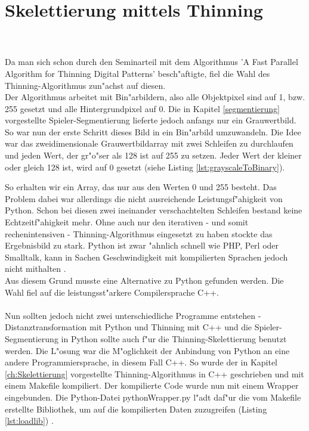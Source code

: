 \section{Skelettierung mittels Thinning} 
\label{implThinning}
 \\ \\
Da man sich schon durch den Seminarteil mit dem Algorithmus 'A Fast Parallel Algorithm for Thinning Digital Patterns' besch"aftigte, fiel die Wahl des Thinning-Algorithmus zun"achst auf diesen. \\
Der Algorithmus arbeitet mit Bin"arbildern, also alle Objektpixel sind auf 1, bzw. 255 gesetzt und alle Hintergrundpixel auf 0. Die in Kapitel \ref{segmentierung} vorgestellte Spieler-Segmentierung lieferte jedoch anfangs nur ein Grauwertbild. So war nun der erste Schritt dieses Bild in ein Bin"arbild umzuwandeln. Die Idee war das zweidimensionale Grauwertbildarray mit zwei Schleifen zu durchlaufen und jeden Wert, der gr"o"ser als 128 ist auf 255 zu setzen. Jeder Wert der kleiner oder gleich 128 ist, wird auf 0 gesetzt (siehe Listing \ref{lst:grayscaleToBinary}). 

So erhalten wir ein Array, das nur aus den Werten 0 und 255 besteht. Das Problem dabei war allerdings die nicht ausreichende Leistungsf"ahigkeit von Python. Schon bei diesen zwei ineinander verschachtelten Schleifen bestand keine Echtzeitf"ahigkeit mehr. Ohne auch nur den iterativen - und somit rechenintensiven - Thinning-Algorithmus eingesetzt zu haben stockte das Ergebnisbild zu stark. Python ist zwar "ahnlich schnell wie PHP, Perl oder Smalltalk, kann in Sachen Geschwindigkeit mit kompilierten Sprachen jedoch nicht mithalten \cite{python}. \\Aus diesem Grund musste eine Alternative zu Python gefunden werden. Die Wahl fiel auf die leistungsst"arkere Compilersprache C++. \\ \\
Nun sollten jedoch nicht zwei unterschiedliche Programme entstehen - Distanztransformation mit Python und Thinning mit C++ und die Spieler-Segmentierung in Python sollte auch f"ur die Thinning-Skelettierung benutzt werden. Die L"osung war die M"oglichkeit der Anbindung von Python an eine andere Programmiersprache, in diesem Fall C++. So wurde der in Kapitel \ref{ch:Skelettierung} vorgestellte Thinning-Algorithmus in C++ geschrieben und mit einem Makefile kompiliert. Der kompilierte Code wurde nun mit einem Wrapper eingebunden. Die Python-Datei pythonWrapper.py l"adt daf"ur die vom Makefile erstellte Bibliothek, um auf die kompilierten Daten zuzugreifen (Listing \ref{lst:loadlib}) .
